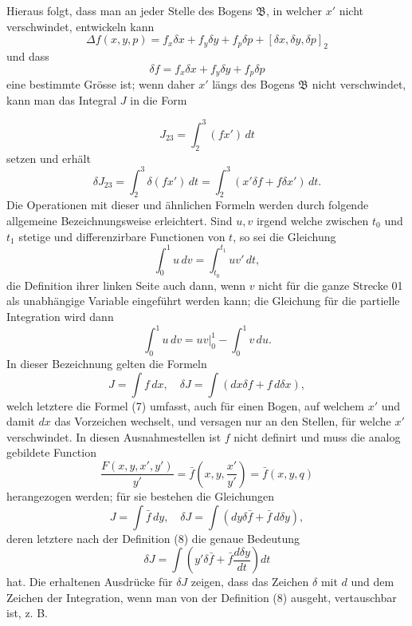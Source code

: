 \documentclass[11pt,a4paper,leqno]{article}
\begin{document}
Hieraus folgt, dass man an jeder Stelle des Bogens \(\mathfrak B\), in welcher \(x'\) nicht verschwindet, entwickeln kann
\[
\Delta f(x,y,p)=f_x\delta x+f_y\delta y+f_p\delta p+[\delta x,\delta y,\delta p]_2
\]
und dass
\[
\delta f=f_x\delta x+f_y\delta y+f_p\delta p
\]
eine bestimmte Grösse ist; wenn daher \(x'\) längs des Bogens \(\mathfrak B\) nicht verschwindet, kann man das Integral \(J\) in die Form

\[
J_{23}=\int_2^3(fx')\,dt
\]
setzen und erhält
\[
\tag{7}
\delta J_{23}=\int_2^3\delta(fx')\,dt=\int_2^3(x'\delta f+f\delta x')\,dt.
\]
Die Operationen mit dieser und ähnlichen Formeln werden durch folgende allgemeine Bezeichnungsweise erleichtert. Sind \(u,v\) irgend welche zwischen \(t_0\) und \(t_1\) stetige und differenzirbare Functionen von \(t\), so sei die Gleichung
\[
\tag{8}
\int_0^1u\,dv=\int_{t_0}^{t_1}uv'\,dt,
\]
die Definition ihrer linken Seite auch dann, wenn \(v\) nicht für die ganze Strecke 01 als unabhängige Variable eingeführt werden kann; die Gleichung für die partielle Integration wird dann
\[
\int_0^1u\,dv=uv\bigg|_0^1-\int_0^1v\,du.
\]
In dieser Bezeichnung gelten die Formeln
\[
J=\int f\,dx,\quad \delta J=\int(dx\delta f+f\,d\delta x),
\]
welch letztere die Formel (7) umfasst, auch für einen Bogen, auf welchem \(x'\) und damit \(dx\) das Vorzeichen wechselt, und versagen nur an den Stellen, für welche \(x'\) verschwindet. In diesen Ausnahmestellen ist \(f\) nicht definirt und muss die analog gebildete Function
\[
\frac{F(x,y,x',y')}{y'}=\bar f\left(x,y,\frac{x'}{y'}\right)=\bar f(x,y,q)
\]
herangezogen werden; für sie bestehen die Gleichungen
\[
J=\int \bar f\,dy,\quad \delta J=\int(dy\delta\bar f+\bar f\,d\delta y),
\]
deren letztere nach der Definition (8) die genaue Bedeutung
\[
\delta J=\int\left(y'\delta\bar f+\bar f\frac{d\delta y}{dt}\right)dt
\]
hat. Die erhaltenen Ausdrücke für \(\delta J\) zeigen, dass das Zeichen \(\delta\) mit \(d\) und dem Zeichen der Integration, wenn man von der Definition (8) ausgeht, vertauschbar ist, z. B.
\end{document}

